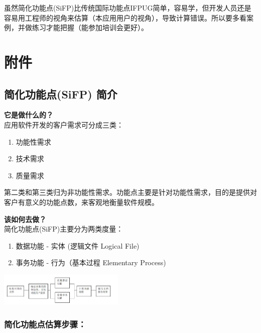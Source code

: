 虽然简化功能点(SiFP)比传统国际功能点IFPUG简单，容易学，但开发人员还是容易用工程师的视角来估算（本应用用户的视角），导致计算错误。所以要多看案例，并做练习才能把握（能参加培训会更好）。

\hypertarget{ux9644ux4ef6}{%
\section{附件}\label{ux9644ux4ef6}}

\hypertarget{ux7b80ux5316ux529fux80fdux70b9sifp-ux7b80ux4ecb}{%
\subsection{简化功能点(SiFP)
简介}\label{ux7b80ux5316ux529fux80fdux70b9sifp-ux7b80ux4ecb}}

 \textbf{它是做什么的？} \\
应用软件开发的客户需求可分成三类：

\begin{enumerate}
\tightlist
\item
  功能性需求
\item
  技术需求
\item
  质量需求
\end{enumerate}

第二类和第三类归为非功能性需求。功能点主要是针对功能性需求，目的是提供对客户有意义的功能点数，来客观地衡量软件规模。

 \textbf{该如何去做？} \\
简化功能点(SiFP)主要分为两类度量：

\begin{enumerate}
\tightlist
\item
  数据功能 - 实体 (逻辑文件 Logical File)
\item
  事务功能 - 行为（基本过程 Elementary Process)
\end{enumerate}


\includegraphics[width=6cm]{功能点计数过程.jpg}

\hypertarget{ux7b80ux5316ux529fux80fdux70b9ux4f30ux7b97ux6b65ux9aa4}{%
\subsubsection{简化功能点估算步骤：}\label{ux7b80ux5316ux529fux80fdux70b9ux4f30ux7b97ux6b65ux9aa4}}

